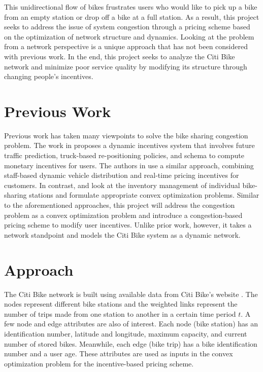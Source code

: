 \documentclass[times, 10pt,twocolumn]{article}
\begin{document}
This unidirectional flow of bikes frustrates users who would like to pick up a bike from an empty station or drop off a bike at a full station. As a result, this project seeks to address the issue of system congestion through a pricing scheme based on the optimization of network structure and dynamics. Looking at the problem from a network perspective is a unique approach that has not been considered with previous work. In the end, this project seeks to analyze the Citi Bike network and minimize poor service quality by modifying its structure through changing people's incentives.

\section{Previous Work}

Previous work has taken many viewpoints to solve the bike sharing congestion problem. The work in \cite{incentives} proposes a dynamic incentives system that involves future traffic prediction, truck-based re-positioning policies, and schema to compute monetary incentives for users. The authors in \cite{redistribution} use a similar approach, combining staff-based dynamic vehicle distribution and real-time pricing incentives for customers. In contrast, \cite{management} and \cite{redistribution} look at the inventory management of individual bike-sharing stations and formulate appropriate convex optimization problems. Similar to the aforementioned approaches, this project will address the congestion problem as a convex optimization problem and introduce a congestion-based pricing scheme to modify user incentives. Unlike prior work, however, it takes a network standpoint and models the Citi Bike system as a dynamic network.

\section{Approach}

The Citi Bike network is built using available data from Citi Bike's website \cite{dataset}. The nodes represent different bike stations and the weighted links represent the number of trips made from one station to another in a certain time period $t$. A few node and edge attributes are also of interest. Each node (bike station) has an identification number, latitude and longitude, maximum capacity, and current number of stored bikes. Meanwhile, each edge (bike trip) has a bike identification number and a user age. These attributes are used as inputs in the convex optimization problem for the incentive-based pricing scheme.
\end{document}
